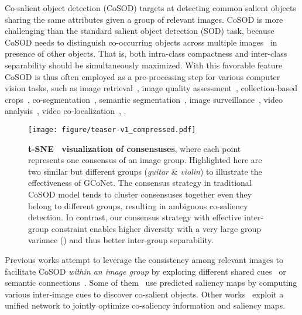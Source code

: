\documentclass[final]{cvpr}
\def\ourmodel{GCoNet}
\begin{document}
Co-salient object detection (CoSOD) targets at detecting common salient objects sharing the same attributes given a group of relevant images. 
CoSOD is more challenging than the standard salient object detection (SOD) task,
because 
CoSOD needs to distinguish co-occurring objects across multiple images~\cite{deng2020re} in presence of other objects.
That is, both intra-class compactness and inter-class separability should be simultaneously maximized.
With this favorable feature CoSOD is thus often employed as a
pre-processing step for various computer vision tasks, such as image retrieval~\cite{cheng2014salientshape}, image quality assessment~\cite{wang2019no}, collection-based crops~\cite{jacobs2010cosaliency}, co-segmentation~\cite{wang2016higher,hsu2019deepco3}, semantic segmentation~\cite{zeng2019joint}, image surveillance~\cite{gao2020trustful}, video analysis~\cite{jerripothula2018efficient}, video co-localization~\cite{jerripothula2016cats}, \etc.   





\begin{figure}[!t]
\centering
\texttt{[image: figure/teaser-v1\_compressed.pdf]}
\caption{\textbf{t-SNE~\cite{maaten2008visualizing} visualization of consensuses}, where each point represents one consensus of an image group. Highlighted here are two similar but different groups (\textit{guitar} \& \textit{violin}) to illustrate the effectiveness of \ourmodel.
The consensus strategy in traditional CoSOD model tends to cluster consensuses together even they belong to different groups, resulting in ambiguous co-saliency detection. In contrast, our consensus strategy with effective inter-group constraint enables higher
diversity with a very large group variance () and thus better inter-group separability.}
\label{fig:teaser}
\end{figure}

Previous works attempt to leverage the consistency among relevant images to facilitate CoSOD \textit{within an image group} by exploring different shared cues~\cite{li2011co,fu2013cluster,cao2014self} or semantic connections~\cite{zhang2016co,han2017unified,hsu2018unsupervised}. 
Some of them~\cite{zou2013segmentation,cheng2014global} use  predicted saliency maps by computing various inter-image cues to discover  co-salient objects. Other works~\cite{deng2020re,zhang2020gradient} exploit a unified network to jointly optimize  co-saliency information and saliency maps. 
\end{document}
